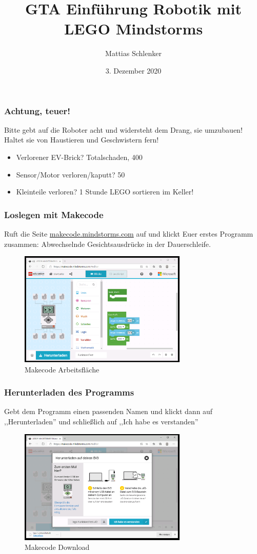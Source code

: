 \documentclass{beamer}
\title{GTA Einführung Robotik mit LEGO Mindstorms}
\author{Mattias Schlenker}
\institute{Wilhelm-Ostwald-Gymnasium}
\date{3. Dezember 2020}
\begin{document}
\frame{\titlepage}

\begin{frame}
\frametitle{Achtung, teuer!}
Bitte gebt auf die Roboter acht und widersteht dem Drang, sie umzubauen! Haltet sie von Haustieren und Geschwistern fern!

\begin{itemize}
\item Verlorener EV-Brick? Totalschaden, 400 \EUR 
\item Sensor/Motor verloren/kaputt? 50 \EUR
\item Kleinteile verloren? 1 Stunde LEGO sortieren im Keller!
\end{itemize}
\end{frame}


\begin{frame}
\frametitle{Loslegen mit Makecode}
Ruft die Seite \href{https://makecode.mindstorms.com/}{makecode.mindstorms.com} auf und klickt Euer erstes Programm zusammen: Abwechselnde Gesichtsausdrücke in der Dauerschleife.

\begin{figure}
  \includegraphics[width=8cm]{mkcd00.png}
  \caption{Makecode Arbeitsfläche}
  \label{fig:mkcd0}
\end{figure}
\end{frame}


\begin{frame}
\frametitle{Herunterladen des Programms}
Gebt dem Programm einen passenden Namen und klickt dann auf ,,Herunterladen'' und schließlich auf ,,Ich habe es  verstanden''

\begin{figure}
  \includegraphics[width=8cm]{mkcd01.png}
  \caption{Makecode Download}
  \label{fig:mkcd1}
\end{figure}
\end{frame}
\end{document}
